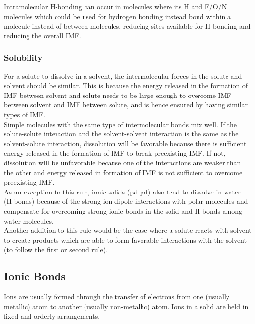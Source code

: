 \documentclass[../main]{subfiles}
\begin{document}
	Intramolecular H-bonding can occur in molecules where its H and F/O/N molecules which could be used for hydrogen bonding instead bond within a molecule instead of between molecules, reducing sites available for H-bonding and reducing the overall IMF.

	\subsubsection{Solubility}

	For a solute to dissolve in a solvent, the intermolecular forces in the solute and solvent should be similar. This is because the energy released in the formation of IMF between solvent and solute needs to be large enough to overcome IMF between solvent and IMF between solute, and is hence ensured by having similar types of IMF. \\

	Simple molecules with the same type of intermolecular bonds mix well. If the solute-solute interaction and the solvent-solvent interaction is the same as the solvent-solute interaction, dissolution will be favorable because there is sufficient energy released in the formation of IMF to break preexisting IMF. If not, dissolution will be unfavorable because one of the interactions are weaker than the other and energy released in formation of IMF is not sufficient to overcome preexisting IMF. \\

	As an exception to this rule, ionic solids (pd-pd) also tend to dissolve in water (H-bonds) because of the strong ion-dipole interactions with polar molecules and compensate for overcoming strong ionic bonds in the solid and H-bonds among water molecules. \\

	Another addition to this rule would be the case where a solute reacts with solvent to create products which are able to form favorable interactions with the solvent (to follow the first or second rule).

	\subsection{Ionic Bonds}


	Ions are usually formed through the transfer of electrons from one (usually metallic) atom to another (usually non-metallic) atom. Ions in a solid are held in fixed and orderly arrangements.
\end{document}

